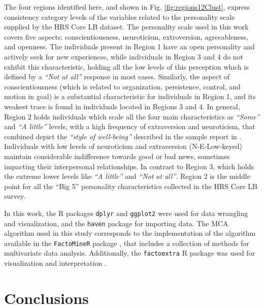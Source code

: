 \documentclass[conference,final,]{IEEEtran}
\begin{document}
The four regions identified here, and shown in Fig.
\ref{fig:regions12Clust}, express consistency category levels of the
variables related to the personality scale \cite{lachman1997midlife}
supplied by the HRS Core LB dataset. The personality scale used in this
work covers five aspects: conscientiousness, neuroticism, extroversion,
agreeableness, and openness. The individuals present in Region 1 have an
open personality and actively seek for new experiences, while
individuals in Region 3 and 4 do not exhibit this characteristic,
holding all the low levels of this perception which is defined by a
\emph{``Not at all''} response in most cases. Similarly, the aspect of
conscientiousness (which is related to organization, persistence,
control, and motion in goal) is a substantial characteristic for
individuals in Region 1, and its weakest trace is found in individuals
located in Regions 3 and 4. In general, Region 2 holds individuals which
scale all the four main characteristics as \emph{``Some''} and \emph{``A
little''} levels, with a high frequency of extraversion and neuroticism,
that combined depict the \emph{``style of well-being''} described in the
sample report in \cite{costa_nodate}. Individuals with low levels of
neuroticism and extraversion (N-E-Low-keyed) maintain considerable
indifference towards good or bad news, sometimes impacting their
interpersonal relationships. In contrast to Region 3, which holds the
extreme lower levels like \emph{``A little''} and \emph{``Not at all''}.
Region 2 is the middle point for all the ``Big 5'' personality
characteristics collected in the HRS Core LB survey.

In this work, the R packages \texttt{dplyr} \cite{Refdplyr} and
\texttt{ggplot2} \cite{ggplotBook} were used for data wrangling and
visualization, and the \texttt{haven} package \cite{wickham2018haven}
for importing data. The MCA algorithm used in this study corresponds to
the implementation of the algorithm available in the \texttt{FactoMineR}
package \cite{le2008factominer}, that includes a collection of methods
for multivariate data analysis. Additionally, the \texttt{factoextra} R
package was used for visualization and interpretation \cite{factoextra}.

\hypertarget{conclusions}{%
\section{Conclusions}\label{conclusions}}
\end{document}
